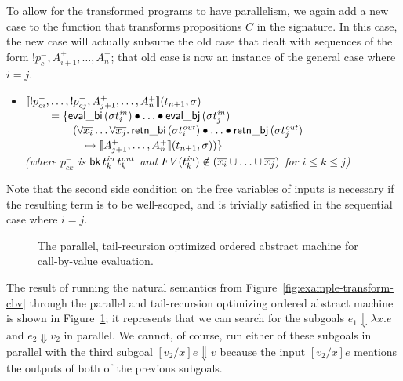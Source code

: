 To allow for the transformed programs to have parallelism, we again
add a new case to the function that transforms propositions $C$ in the
signature.  In this case, the new case will actually subsume the old
case that dealt with sequences of the form ${!}p_c^-,
A^+_{i+1},\ldots,A^+_n$; that old case is now an instance of the
general case where $i = j$. 

\begin{itemize}
\item $\llbracket {{!}p^-_{ci},\ldots,{!}p^-_{cj},A^+_{j+1},\ldots,A^+_n} \rrbracket({t_{n+1}},{\sigma})$
  \\
  $~ \qquad = \{ {\sf eval\_bi}\,({\sigma}t^{\it in}_i) 
                    \mathbin{\bullet} \ldots \mathbin{\bullet}
                 {\sf eval\_bj}\,({\sigma}t^{\it in}_j)$
  \\
  $~ \qquad \qquad (\forall\overline{x_i}\ldots\forall\overline{x_j}.\, 
     {\sf retn\_bi}\,(\sigma{t^{\it out}_i})
     \mathbin{\bullet} \ldots \mathbin{\bullet} 
     {\sf retn\_bj}\,(\sigma{t^{\it out}_j})$
  \\
  $~ \qquad \qquad \quad
   \rightarrowtail \llbracket {A^+_{j+1},\ldots,A^+_n} \rrbracket({t_{n+1}},{\sigma})) \}$\\
  {\it (where
   $p^-_{ck}$ is ${\sf bk}\,t^{\it in}_k\,t^{\it out}_k$ 
   and $FV(t_k^{\it in}) \notin (\overline{x_i} \cup \ldots \cup \overline{x_j})$ 
   for $i \leq k \leq j$)}
\end{itemize}

\noindent
Note that the second side condition on the free variables of inputs is
necessary if the resulting term is to be well-scoped, and is trivially 
satisfied in the sequential case where $i = j$. 

\begin{figure}
\caption{The parallel, tail-recursion optimized ordered abstract machine for
 call-by-value evaluation.}
\label{fig:cbv-ev-ssos-par}
\end{figure}

The result of running the natural semantics from
Figure~\ref{fig:example-transform-cbv} through the parallel and
tail-recursion optimizing ordered abstract machine is shown in
Figure~\ref{fig:cbv-ev-ssos-par}; it represents that we can
search for the subgoals $e_1 \Downarrow \lambda x.e$ and
$e_2 \Downarrow v_2$ in parallel. We cannot, of course, run either
of these subgoals in parallel with the third subgoal 
$[v_2/x]e \Downarrow v$ because the input $[v_2/x]e$ mentions the outputs
of both of the previous subgoals. 

